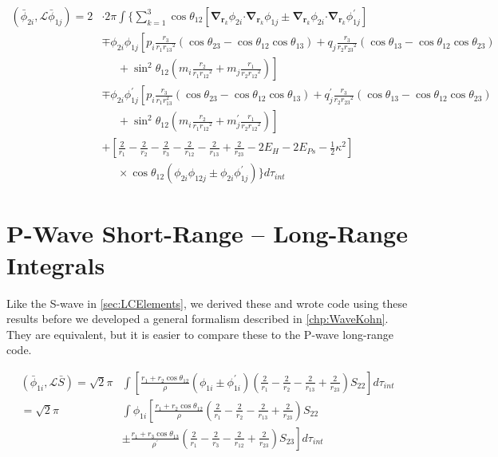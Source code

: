 \documentclass[Dissertation.tex]{subfiles}
\begin{document}
\begin{align}
\label{eq:PWavePhi2Phi1}
\left(\bar{\phi}_{2i},\mathcal{L} \bar{\phi}_{1j}\right) = 2 & \cdot 2\pi \int \Bigg\{ \sum_{k=1}^3 \cos\theta_{12} \left[ \boldsymbol{\nabla}_{\!\mathbf{r}_k} \nonumber \phi_{2i} \boldsymbol{\cdot} \boldsymbol{\nabla}_{\!\mathbf{r}_k} \phi_{1j} \pm \boldsymbol{\nabla}_{\!\mathbf{r}_k} \phi_{2i} \boldsymbol{\cdot} \boldsymbol{\nabla}_{\!\mathbf{r}_k} \phi_{1j}^\prime \right] \\
 \nonumber &\mp \phi_{2i} \phi_{1j} \left[p_i \frac{r_3}{r_1 {r_{13}}^2} (\cos\theta_{23} - \cos\theta_{12} \cos\theta_{13}) + q_j \frac{r_3}{r_2 {r_{23}}^2}(\cos\theta_{13}-\cos\theta_{12} \cos\theta_{23})\right.\\
 \nonumber & \left. \;\;\;\;\;  + \sin^2\theta_{12} \left(m_i \frac{r_2}{r_1 {r_{12}}^2} + m_j \frac{r_1}{r_2 {r_{12}}^2} \right) \right] \\
 \nonumber &\mp \phi_{2i} \phi_{1j}^\prime \left[p_i \frac{r_3}{r_1 r_{13}^2} (\cos\theta_{23} - \cos\theta_{12} \cos\theta_{13}) + q_j^\prime \frac{r_3}{r_2 {r_{23}}^2}(\cos\theta_{13}-\cos\theta_{12} \cos\theta_{23})\right.\\
 \nonumber & \left. \;\;\;\;\;  + \sin^2\theta_{12} \left(m_i \frac{r_2}{r_1 {r_{12}}^2} + m_j^\prime \frac{r_1}{r_2 {r_{12}}^2} \right) \right] \\
 \nonumber &+ \left. \left[\frac{2}{r_1} - \frac{2}{r_2} - \frac{2}{r_3} - \frac{2}{r_{12}} - \frac{2}{r_{13}} + \frac{2}{r_{23}} - 2 E_H - 2 E_{Ps} - \frac{1}{2}\kappa^2 \right] \right. \\
 &\;\;\;\;\; \times \cos\theta_{12} \left(\phi_{2i} \phi_{12j} \pm \phi_{2i} \phi_{1j}^\prime \right) \Bigg\} d\tau_{int}
\end{align}


\section{P-Wave Short-Range -- Long-Range Integrals}
\label{sec:PWaveShortLong}

Like the S-wave in \cref{sec:LCElements}, we derived these and wrote code using these results before we developed a general formalism described in \cref{chp:WaveKohn}. They are equivalent, but it is easier to compare these to the P-wave long-range code.

\begin{align}
\label{eq:PWavePhi1SBar}
\nonumber \left(\bar{\phi}_{1i},\mathcal{L} \bar{S}\right) = \sqrt{2} \pi & \int \left[ \frac{r_1 + r_2 \cos\theta_{12}}{\rho} \left(\phi_{1i} \pm \phi_{1i}^\prime \right) \left(\frac{2}{r_1} - \frac{2}{r_2} - \frac{2}{r_{13}} + \frac{2}{r_{23}} \right) S_{22} \right] d\tau_{int} \\
\nonumber = \sqrt{2} \pi & \int \phi_{1i} \left[ \frac{r_1 + r_2 \cos\theta_{12}}{\rho} \left( \frac{2}{r_1} - \frac{2}{r_2} - \frac{2}{r_{13}} + \frac{2}{r_{23}} \right) S_{22} \right. \\
& \pm \left. \frac{r_1 + r_3 \cos\theta_{13}}{\rho^\prime} \left( \frac{2}{r_1} - \frac{2}{r_3} - \frac{2}{r_{12}} + \frac{2}{r_{23}} \right) S_{23} \right]  d\tau_{int}
\end{align}
\end{document}

